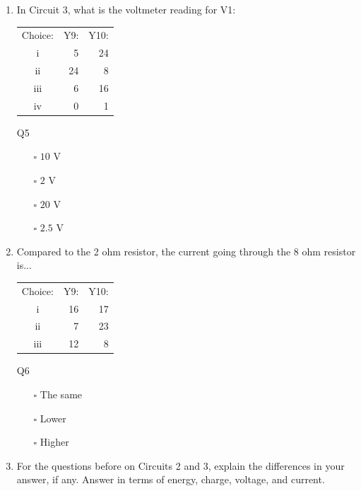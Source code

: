 \documentclass[a4paper,openany,nobib]{tufte-book}
\newcommand{\Qline}[1]{\noindent\rule{#1}{0.6pt}}
\newcounter{ql}
\newcommand{\Qlines}[1]{\forloop{ql}{0}{\value{ql}<#1}{\vskip0em\Qline{\linewidth}}}
\begin{document}
\begin{enumerate}
		\newpage
	\setcounter{enumi}{4}
	\item In Circuit 3, what is the voltmeter reading for V1:
		\begin{margintable}
		\begin{center}
		\begin{tabular}{crr}
		\toprule
		 Choice: & Y9: & Y10:\\
		 i & 5 & 24\\
		 ii & 24 & 8\\
		 iii & 6 & 16\\
		 iv & 0 & 1\\
		 \bottomrule
		\end{tabular}
		\caption{\centering Q5}
		\end{center}
		\end{margintable}
		\begin{itemize}
			\item[$\square$]$10$ V
			\item[$\square$]$2$ V
			\item[$\square$]$20$ V
			\item[$\square$]$2.5$ V
		\end{itemize}
	\item Compared to the 2 ohm resistor, the current going through the 8 ohm resistor is...
		\begin{margintable}[1cm]
		\begin{center}
		\begin{tabular}{crr}
		\toprule
		 Choice: & Y9: & Y10:\\
		 i & 16 & 17\\
		 ii & 7 & 23\\
		 iii & 12 & 8\\
		 \bottomrule
		\end{tabular}
		\caption{\centering Q6}
		\end{center}
		\end{margintable}
	\begin{itemize}
		\item[$\square$] The same
		\item[$\square$] Lower
		\item[$\square$] Higher
	\end{itemize}
\item For the questions before on Circuits 2 and 3, explain the differences in your answer, if any. Answer in terms of energy, charge, voltage, and current.
		\Qlines{2}
\end{enumerate}
\end{document}
